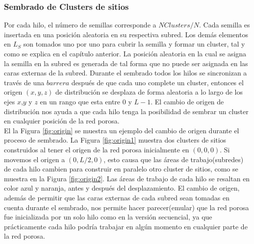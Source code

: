 \subsubsection{Sembrado de Clusters de sitios}
\label{subsec:pseeding}
Por cada hilo, el número de semillas corresponde a $NClusters/N$. Cada semilla es insertada en una posición aleatoria en su 
respectiva subred. Los demás elementos en $L_S$ son tomados uno por uno para cubrir la semilla y formar un cluster, tal y como se 
explica en el capítulo anterior. La posición aleatoria en la cual se asigna la semilla en la subred es generada de tal forma 
que no puede ser asignada en las caras externas de la subred. Durante el sembrado todos los hilos se sincronizan a través 
de una $barrera$ después de que cada uno complete un cluster, entonces el origen $(x, y, z)$ de distribución se desplaza 
de forma aleatoria a lo largo de los ejes $x$,$y$ y $z$ en un rango que esta entre $0$ y $L-1$. 
El cambio de origen de distribución nos ayuda a que cada hilo tenga la posibilidad de sembrar un cluster en cualquier 
posición de la red porosa.\\

El la Figura \ref{fig:origin} se muestra un ejemplo del cambio de origen durante el proceso de sembrado. La Figura \ref{fig:origin1}  muestra dos clusters de sitios construidos al tener el origen de la red porosa inicialmente en $(0,0,0)$. Si movemos el origen a $(0,L/2,0)$,  esto causa que las áreas de trabajo(subredes) de cada hilo cambien para construir en paralelo otro cluster de sitios,  como se muestra en la Figura \ref{fig:origin2}. Las áreas de trabajo de cada hilo se resaltan en color azul y naranja, antes y después del desplazamiento. El cambio de origen, además de permitir que las caras externas de cada subred sean tomadas en  cuenta durante el sembrado, nos permite hacer parecer(emular) que la red porosa fue inicializada por un solo hilo como en la versión secuencial, ya que prácticamente cada hilo podría trabajar en algún momento en cualquier parte de la red porosa.\\

